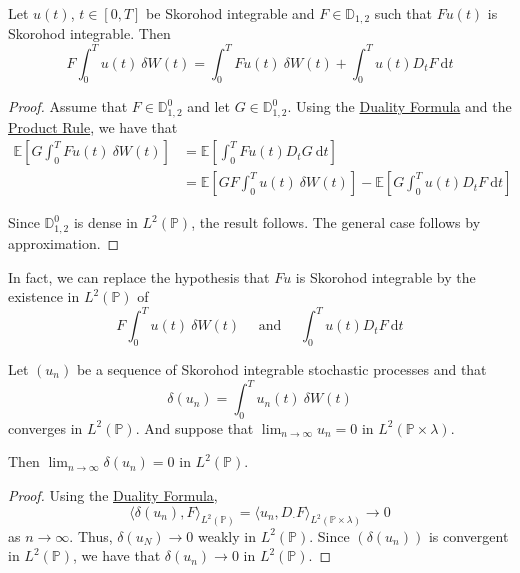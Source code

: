 \begin{theorem}
	Let $u(t)$, $t \in [0,T]$ be Skorohod integrable and $F \in \mathbb{D}_{1,2}$ such that $Fu(t)$ is Skorohod integrable. Then 
	$$
	F \int_0^T u(t) ~\delta W(t) = \int_0^T Fu(t) ~\delta W(t) + \int_0^T u(t) D_t F~\mathrm{d}t
	$$
\end{theorem}

\begin{proof}
	Assume that $F \in \mathbb{D}_{1,2}^0$ and let $G \in \mathbb{D}_{1,2}^0$. Using the \hyperref[thm:duality_formula]{Duality Formula} and the \hyperref[thm:product_rule]{Product Rule}, we have that 
	\begin{equation*}
		\begin{aligned}
			\mathbb{E} \left[ G \int_0^T Fu(t)~\delta W(t) \right] &= \mathbb{E} \left[ \int_0^T Fu(t) D_t G~\mathrm{d}t \right] \\
									       &= \mathbb{E} \left[ GF \int_0^T u(t)~\delta W(t) \right] - \mathbb{E} \left[ G \int_0^T u(t) D_t F~\mathrm{d}t \right]
		\end{aligned}
	\end{equation*}

	Since $\mathbb{D}_{1,2}^0$ is dense in $L^2(\mathbb{P})$, the result follows. The general case follows by approximation.
\end{proof}

In fact, we can replace the hypothesis that $Fu$ is Skorohod integrable by the existence in $L^2(\mathbb{P})$ of 
$$
F \int_0^T u(t) ~\delta W(t) \quad \text{ and } \quad \int_0^T u(t) D_t F ~\mathrm{d}t
$$

\begin{theorem}
Let $(u_n)$ be a sequence of Skorohod integrable stochastic processes and that 
$$
\delta(u_n) = \int_0^T u_n(t) ~\delta W(t)
$$
converges in $L^2(\mathbb{P})$. And suppose that $\lim_{n \to \infty} u_n = 0$ in $L^2(\mathbb{P} \times \lambda)$. 

Then 
$ 
\lim_{n \to \infty} \delta(u_n) = 0
$
in $L^2(\mathbb{P})$. 
\end{theorem}

\begin{proof}
	Using the \hyperref[thm:duality_formula]{Duality Formula}, 
	$$
	\langle \delta(u_n), F \rangle_{L^2(\mathbb{P})} = \langle u_n, D_{\cdot} F \rangle_{L^2(\mathbb{P} \times \lambda)} \longrightarrow 0
	$$
	as $n \to \infty$. Thus, $\delta(u_N) \to 0$ weakly in $L^2(\mathbb{P})$. Since $(\delta(u_n))$ is convergent in $L^2(\mathbb{P})$, we have that $\delta(u_n) \to 0$ in $L^2(\mathbb{P})$.
\end{proof}

